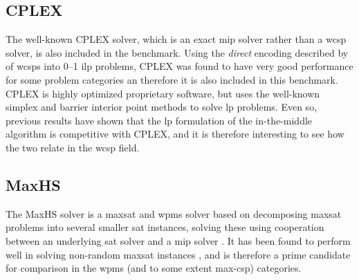 \subsection{CPLEX}
The well-known CPLEX solver, which is an exact \gls{mip} solver rather than a \gls{wcsp} solver, is also included in the benchmark.
Using the \emph{direct} encoding described by \textcite{deGivry14} of \glspl{wcsp} into 0--1 \gls{ilp} problems, CPLEX was found to have very good performance for some problem categories an therefore it is also included in this benchmark.
CPLEX is highly optimized proprietary software, but uses the well-known simplex and barrier interior point methods to solve \gls{lp} problems.
Even so, previous results \parencite{Mason01,Ernst05} have shown that the \gls{lp} formulation of the in-the-middle algorithm is competitive with CPLEX, and it is therefore interesting to see how the two relate in the \gls{wcsp} field.

\subsection{MaxHS}
The MaxHS solver is a \gls{maxsat} and \gls{wpms} solver based on decomposing \gls{maxsat} problems into several smaller \gls{sat} instances, solving these using cooperation between an underlying \gls{sat} solver and a \gls{mip} solver \parencite{Davies11}.
It has been found to perform well in solving non-random \gls{maxsat} instances \parencite{Davies13}, and is therefore a prime candidate for comparison in the \gls{wpms} (and to some extent max-\gls{csp}) categories.
